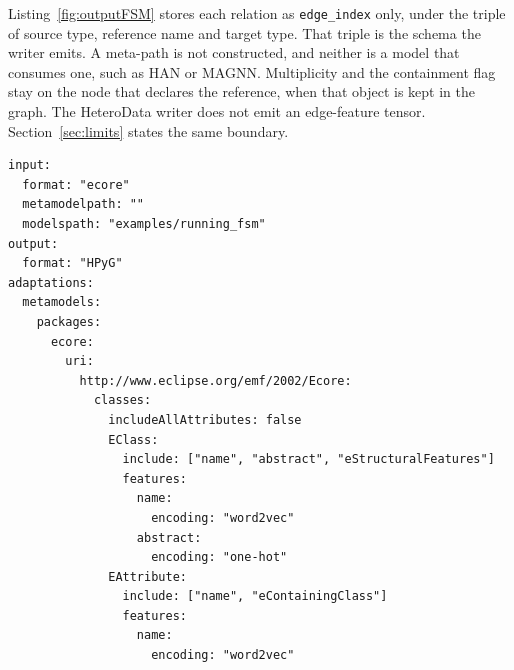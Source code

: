 \documentclass[journal,article,submit,moreauthors,technologies]{Definitions/mdpi}
\newcommand{\rev}[1]{#1}
\begin{document}
\rev{Listing~\ref{fig:outputFSM} stores each relation as \texttt{edge\_index} only, under the triple of source type, reference name and target type. That triple is the schema the writer emits. A meta-path is not constructed, and neither is a model that consumes one, such as HAN or MAGNN. Multiplicity and the containment flag stay on the node that declares the reference, when that object is kept in the graph. The HeteroData writer does not emit an edge-feature tensor. Section~\ref{sec:limits} states the same boundary.}



\begin{program_}[H]
\footnotesize
\begin{verbatim}
input:
  format: "ecore"
  metamodelpath: ""
  modelspath: "examples/running_fsm"
output:
  format: "HPyG"
adaptations:
  metamodels:
    packages:
      ecore:
        uri:
          http://www.eclipse.org/emf/2002/Ecore:
            classes:
              includeAllAttributes: false
              EClass:
                include: ["name", "abstract", "eStructuralFeatures"]
                features:
                  name:
                    encoding: "word2vec"
                  abstract:
                    encoding: "one-hot"
              EAttribute:
                include: ["name", "eContainingClass"]
                features:
                  name:
                    encoding: "word2vec"
\end{verbatim}
\caption{\rev{A configuration that encodes the running-example metamodel. \texttt{eType} is a reference, so it stays an edge; the encoding keys apply to the attributes \texttt{name} and \texttt{abstract}.}}
\label{code:yamlecoreAttribute}
\end{program_}
\end{document}
